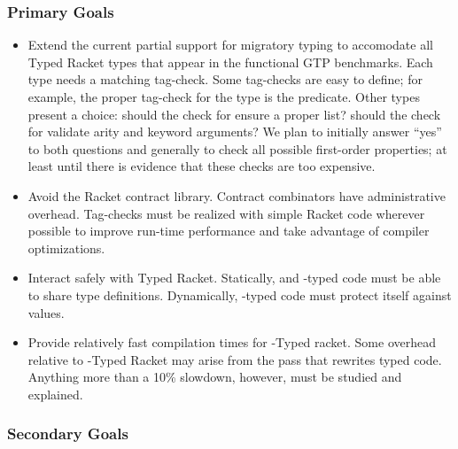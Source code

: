 \subsubsection{Primary Goals}

\begin{itemize}
  \item
    Extend the current partial support for \tshallow{} migratory typing
     to accomodate all Typed Racket types that appear in the functional GTP
     benchmarks.
    Each type needs a matching tag-check.
    Some tag-checks are easy to define; for example, the proper tag-check for
     the  type is the  predicate.
    Other types present a choice:
     should the check for  ensure a proper list?
     should the check for \racketcode{->*} validate arity and keyword arguments?
    We plan to initially answer ``yes'' to both questions and generally to check
     all possible first-order properties; at least until there is evidence
     that these checks are too expensive.
  \item
    Avoid the Racket contract library.
    Contract combinators have administrative overhead.
    Tag-checks must be realized with simple Racket code wherever possible to
     improve run-time performance and take advantage of compiler optimizations.
  \item
    Interact safely with Typed Racket.
    Statically, \tshallow{} and \tdeep{}-typed code must be able to share type definitions.
    Dynamically, \tdeep{}-typed code must protect itself against \tshallow{} values.
  \item
    Provide relatively fast compilation times for \tshallow{}-Typed racket.
    Some overhead relative to \tdeep{}-Typed Racket may arise from the pass that
    rewrites typed code.
    Anything more than a 10\% slowdown, however, must be studied and explained.
\end{itemize}


\subsubsection{Secondary Goals}

